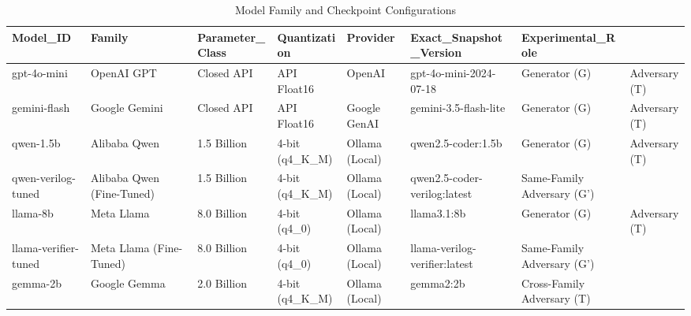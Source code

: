 \begin{table}
\caption{Model Family and Checkpoint Configurations}
\label{tab:models}
\begin{tabular}{lllllll}
\toprule
Model_ID & Family & Parameter_Class & Quantization & Provider & Exact_Snapshot_Version & Experimental_Role \\
\midrule
gpt-4o-mini & OpenAI GPT & Closed API & API Float16 & OpenAI & gpt-4o-mini-2024-07-18 & Generator (G) & Adversary (T) \\
gemini-flash & Google Gemini & Closed API & API Float16 & Google GenAI & gemini-3.5-flash-lite & Generator (G) & Adversary (T) \\
qwen-1.5b & Alibaba Qwen & 1.5 Billion & 4-bit (q4_K_M) & Ollama (Local) & qwen2.5-coder:1.5b & Generator (G) & Adversary (T) \\
qwen-verilog-tuned & Alibaba Qwen (Fine-Tuned) & 1.5 Billion & 4-bit (q4_K_M) & Ollama (Local) & qwen2.5-coder-verilog:latest & Same-Family Adversary (G') \\
llama-8b & Meta Llama & 8.0 Billion & 4-bit (q4_0) & Ollama (Local) & llama3.1:8b & Generator (G) & Adversary (T) \\
llama-verifier-tuned & Meta Llama (Fine-Tuned) & 8.0 Billion & 4-bit (q4_0) & Ollama (Local) & llama-verilog-verifier:latest & Same-Family Adversary (G') \\
gemma-2b & Google Gemma & 2.0 Billion & 4-bit (q4_K_M) & Ollama (Local) & gemma2:2b & Cross-Family Adversary (T) \\
\bottomrule
\end{tabular}
\end{table}
